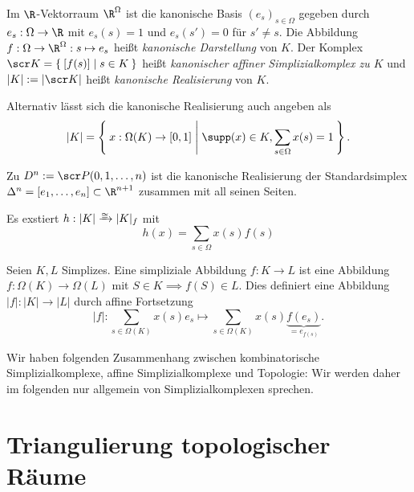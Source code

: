 \begin{df}
	Im $\R$-Vektorraum $\R^\Omega$ ist die kanonische Basis $(e_s)_{s \in \Omega}$ gegeben durch $e_s: \Omega \to \R$ mit $e_s(s) = 1$ und $e_s(s') = 0$ für $s' \neq s$.
	Die Abbildung $f: \Omega \to \R^\Omega: s \mapsto e_s$ heißt \emph{kanonische Darstellung} von $K$.
	Der Komplex $\scr K = \Set{ [f(s)] | s \in K}$ heißt \emph{kanonischer affiner Simplizialkomplex zu $K$} und $|K| := |\scr K|$ heißt \emph{kanonische Realisierung} von $K$.
\end{df}

\begin{nt}
	Alternativ lässt sich die kanonische Realisierung auch angeben als
	\[
		|K| = \Set{ x: \Omega(K) \to [0,1] | \supp(x) \in K, \sum_{s \in \Omega} x(s) = 1 }.
	\]
\end{nt}

\begin{ex}
	Zu $D^n := \scr P({0, 1, \dotsc, n})$ ist die kanonische Realisierung der Standardsimplex $\Delta^n = [e_1, \dotsc, e_n] \subset \R^{n+1}$ zusammen mit all seinen Seiten.
\end{ex}

\begin{nt}
	Es exstiert $h: |K| \homto |K|_f$ mit
	\[
		h(x) = \sum_{s\in \Omega} x(s) f(s)
	\]
\end{nt}

\begin{df}
	Seien $K, L$ Simplizes.
	Eine simpliziale Abbildung $f: K \to L$ ist eine Abbildung $f: \Omega(K) \to \Omega(L)$ mit $S \in K \implies f(S) \in L$.
	Dies definiert eine Abbildung $|f|: |K| \to |L|$ durch affine Fortsetzung
	\[
		|f|:
		\sum_{s \in \Omega(K)} x(s) e_s
		\mapsto
		\sum_{s \in \Omega(K)} x(s) \underbrace{f(e_s)}_{= e_{f(s)}}.
	\]
\end{df}

\begin{nt}
	Wir haben folgenden Zusammenhang zwischen kombinatorische Simplizialkomplexe, affine Simplizialkomplexe und Topologie:
	Wir werden daher im folgenden nur allgemein von Simplizialkomplexen sprechen.
\end{nt}


\section{Triangulierung topologischer Räume}


